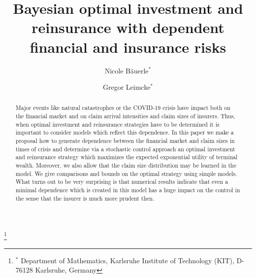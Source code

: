 \documentclass[reqno, 11pt]{amsart}%
\theoremstyle{definition}
\numberwithin{equation}{section} \numberwithin{theorem}{section}
\begin{document}
\title[Optimal investment and reinsurance problems]{Bayesian optimal investment and reinsurance with dependent financial and insurance risks}
\author[N. \smash{B\"auerle}]{Nicole B\"auerle${}^*$}
\address[N. B\"auerle]{Department of Mathematics,
Karlsruhe Institute of Technology (KIT), D-76128 Karlsruhe, Germany}


\author[G. \smash{Leimcke}]{Gregor Leimcke${}^*$}
\address[G. Leimcke]{Department of Mathematics,
Karlsruhe Institute of Technology (KIT), D-76128 Karlsruhe, Germany}


\thanks{${}^*$ Department of Mathematics,
Karlsruhe Institute of Technology (KIT), D-76128 Karlsruhe, Germany}
\begin{abstract}
Major events like natural catastrophes or the COVID-19 crisis have impact both on the financial market and on claim arrival intensities and claim sizes of insurers. Thus, when optimal  investment and reinsurance  strategies have to be determined  it is important to consider models which reflect this dependence. In this paper we make a proposal how to generate dependence between the financial market and claim sizes in times of crisis and determine via a stochastic control approach an optimal  investment and reinsurance  strategy which maximizes the expected exponential utility of terminal wealth. Moreover, we also allow that the claim size distribution may be learned in the model. We give comparisons and bounds on the optimal strategy using simple models. What turns out to be very surprising is that numerical results indicate that even a  minimal dependence which is created in this model has a huge impact on the control in the sense that the insurer is much more prudent then.

\end{abstract}
\maketitle




\makeatletter \providecommand{} \makeatother


\end{document}
